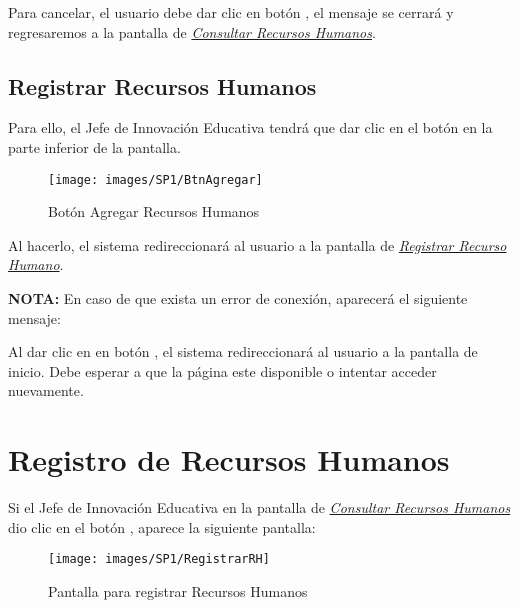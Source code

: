         	Para cancelar, el usuario debe dar clic en botón , el mensaje se cerrará y regresaremos a la pantalla de \hyperlink{consultarrh}{\textit{Consultar Recursos Humanos}}.\\

    	\subsection{Registrar Recursos Humanos}

        	Para ello, el Jefe de Innovación Educativa tendrá que dar clic en el botón \IUbutton{+} en la parte inferior de la pantalla.
        
        	\begin{figure}[!hbtp]
        		\centering
        		\hypertarget{add}{\texttt{[image: images/SP1/BtnAgregar]}}
        		\caption{Botón Agregar Recursos Humanos}
        		\label{add}
        	\end{figure}
        
        	Al hacerlo, el sistema redireccionará al usuario a la pantalla de \hyperlink{registrarrh}{\textit{Registrar Recurso Humano}}.
        
        
            \textbf{NOTA:} En caso de que exista un error de conexión, aparecerá el siguiente mensaje:
        
            Al dar clic en en botón , el sistema redireccionará al usuario a la pantalla de inicio. Debe esperar a que la página este disponible o intentar acceder nuevamente.
\newpage
    
    \section{Registro de Recursos Humanos}
        Si el Jefe de Innovación Educativa en la pantalla de \hyperlink{consultarrh}{\textit{Consultar Recursos Humanos}} dio clic en el botón \IUbutton{+}, aparece la siguiente pantalla:

        \begin{figure}[!hbtp]
            \centering
            \hypertarget{registrarrh}{\texttt{[image: images/SP1/RegistrarRH]}}
            \caption{Pantalla para registrar Recursos Humanos}
            \label{registrarrh}
        \end{figure}
        
